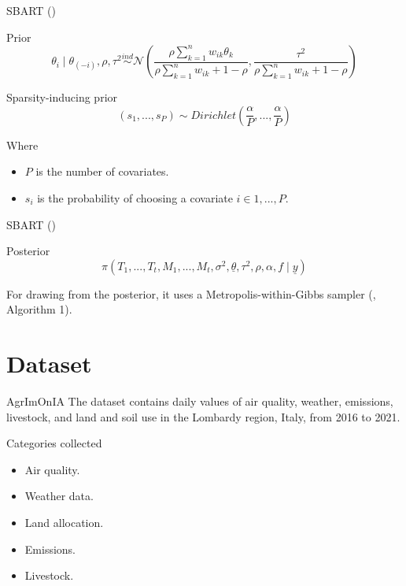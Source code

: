 \documentclass[10pt]{beamer}
\begin{document}
\begin{frame}{SBART (\cite{Kim_2022})}
    \begin{block}{Prior}
        \begin{equation}
            \theta_i \mid \theta_{(-i)}, \rho, \tau^2 \stackrel{ind}{\sim} \mathcal{N}\left( \frac{\rho\sum_{k=1}^nw_{ik}\theta_k}{\rho\sum_{k=1}^nw_{ik}+1-\rho},\frac{\tau^2}{\rho\sum_{k=1}^nw_{ik}+1-\rho}\right)
        \end{equation}
    \end{block}
    
    \begin{block}{Sparsity-inducing prior}
        \begin{equation}
            (s_1, ... ,s_P) \sim Dirichlet\left(\frac{\alpha}{P}, ... ,\frac{\alpha}{P} \right)
        \end{equation}
    \end{block}
    Where 
    \begin{itemize}
        \item $P$ is the number of covariates.
        \item $s_i$ is the probability of choosing a covariate $i \in {1,...,P}$.
    \end{itemize}
    
    
\end{frame}

\begin{frame}{SBART (\cite{Kim_2022})}
    \begin{block}{Posterior}
        \begin{equation}
            \pi(T_1,...,T_t, M_1,...,M_t, \sigma^2, \underline{\theta}, \tau^2, \rho, \alpha, f \mid \underline{y})
        \end{equation}
    \end{block}
    For drawing from the posterior, it uses a Metropolis-within-Gibbs sampler (\cite{Kim_2022}, Algorithm 1).
\end{frame}

\section{Dataset}


\begin{frame}{AgrImOnIA}
    The dataset contains daily values of air quality, weather, emissions, livestock, and land and soil use in the Lombardy region, Italy, from 2016 to 2021.
    \begin{block}{Categories collected}
        \begin{itemize}
            \item Air quality.
            \item Weather data.
            \item Land allocation.
            \item Emissions.
            \item Livestock.
        \end{itemize}
    \end{block}
\end{frame}
\end{document}
